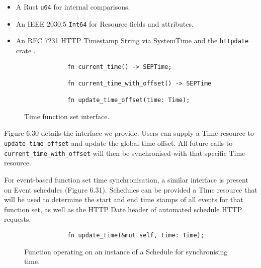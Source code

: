 \begin{itemize}
    \item A Rust \texttt{u64} for internal comparisons.
    \item An IEEE 2030.5 \texttt{Int64} for Resource fields and attributes.
    \item An RFC 7231 HTTP Timestamp String via SystemTime and the \texttt{httpdate} crate \cite{httpdate}.
\end{itemize} 


\begin{figure}[h]
    \begin{center}
        \begin{lstlisting}
            fn current_time() -> SEPTime;
            
            fn current_time_with_offset() -> SEPTime
            
            fn update_time_offset(time: Time);
        \end{lstlisting}
        \label{fig:timeinterface}
        \vspace{-10pt}
        \caption{Time function set interface.}
    \end{center}
\end{figure}

Figure 6.30 details the interface we provide. Users can supply a Time resource to \texttt{update\_time\_offset} and update the global time offset. All future calls to \texttt{current\_time\_with\_offset} will then be synchronised with that specific Time resource.

For event-based function set time synchronisation, a similar interface is present on Event schedules (Figure 6.31). Schedules can be provided a Time resource that will be used to determine the start and end time stamps of all events for that function set, as well as the HTTP Date header of automated schedule HTTP requests.

\begin{figure}[h]
    \begin{center}
        \begin{lstlisting}
            fn update_time(&mut self, time: Time);
        \end{lstlisting}
        \label{fig:eventtime}
        \vspace{-10pt}
        \caption{Function operating on an instance of a Schedule for synchronising time.}
    \end{center}
\end{figure}

